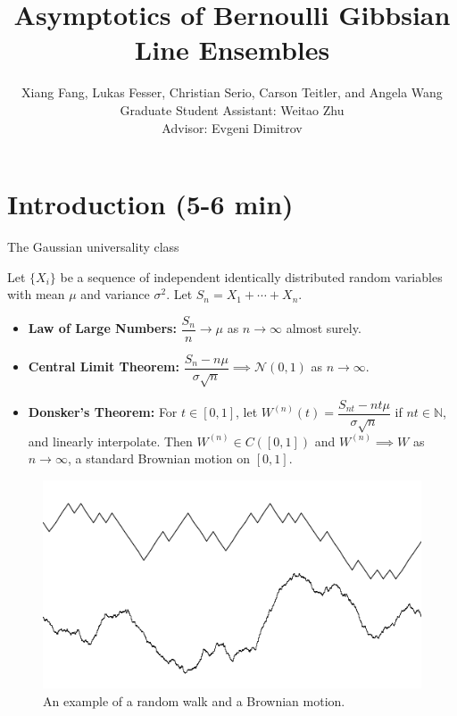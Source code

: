 \documentclass[9pt,t,dvipsnames]{beamer}
\title{Asymptotics of Bernoulli Gibbsian Line Ensembles}
\author[Fang, Fesser, Serio, Teitler, and Wang]{Xiang Fang, Lukas Fesser, Christian Serio, Carson Teitler, and Angela Wang \\
Graduate Student Assistant: Weitao Zhu\\
Advisor: Evgeni Dimitrov}
\institute[Columbia]{Columbia University REU}
\begin{document}
	
	\begin{frame}
		\maketitle
	\end{frame}


\section{Introduction (5-6 min)}

\begin{frame}{The Gaussian universality class}

Let $\{X_i\}$ be a sequence of independent identically distributed random variables with mean $\mu$ and variance $\sigma^2$. Let $S_n = X_1 + \cdots + X_n$.

\bigskip

\begin{itemize}
\item \textbf{Law of Large Numbers:} $\dfrac{S_n}{n} \longrightarrow \mu$ as $n \rightarrow \infty$ almost surely.

\bigskip

\item \textbf{Central Limit Theorem:} $\dfrac{S_n - n\mu}{\sigma\sqrt{n}} \implies \mathcal{N}(0, 1)$ as $n \rightarrow \infty$.

\bigskip

\item \textbf{Donsker's Theorem:} For $t\in[0,1]$, let $W^{(n)}(t) = \dfrac{S_{nt}-nt\mu}{\sigma\sqrt{n}}$ if $nt\in\mathbb{N}$, and linearly interpolate. Then $W^{(n)} \in C([0, 1])$ and $W^{(n)} \implies W$ as $n\to\infty$, a standard Brownian motion on $[0,1]$.
\end{itemize}
\begin{figure}
\includegraphics[height=0.25\textheight]{graphics/Gaussian.png}
\caption{An example of a random walk and a Brownian motion.}
\end{figure}

\end{frame}
\end{document}
